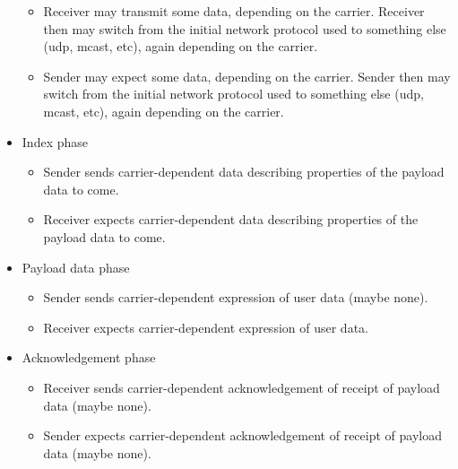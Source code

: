 \documentclass[a4]{article}
\begin{document}
\begin{itemize}
\begin{itemize}
  \item Receiver may transmit some data, depending on the carrier.
    Receiver then may switch from the initial network
    protocol used to something else (udp, mcast, etc), again
    depending on the carrier.
    
  \item Sender may expect some data, depending on the carrier.
    Sender then may switch from the initial network
    protocol used to something else (udp, mcast, etc), again
    depending on the carrier.

  \end{itemize}

\item Index phase
    
  \begin{itemize}
    
  \item Sender sends carrier-dependent data describing properties of
    the payload data to come.
    
  \item Receiver expects carrier-dependent data describing properties
    of the payload data to come.
    
  \end{itemize}
  
\item Payload data phase
  
  \begin{itemize}
    
  \item Sender sends carrier-dependent expression of user data (maybe none).
    
  \item Receiver expects carrier-dependent expression of user data.
    
  \end{itemize}

\item Acknowledgement phase

  \begin{itemize}
    
  \item Receiver sends carrier-dependent acknowledgement of receipt of
    payload data (maybe none).
    
  \item Sender expects carrier-dependent acknowledgement of receipt of
    payload data (maybe none).
    
  \end{itemize}
  
\end{itemize}
\end{document}
